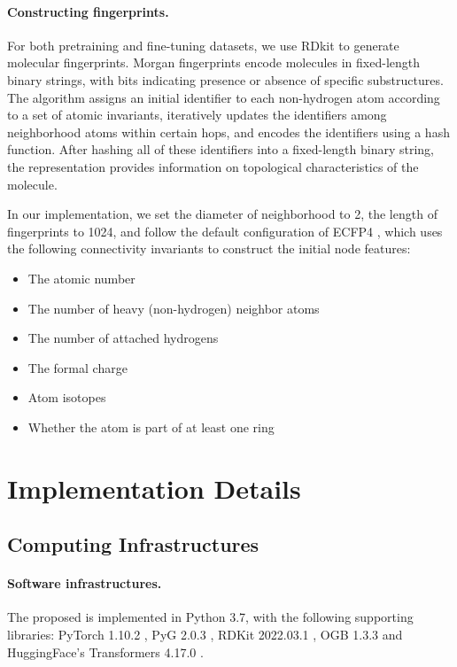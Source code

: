 \paragraph{Constructing fingerprints.}
For both pretraining and fine-tuning datasets, we use RDkit to generate molecular fingerprints.
Morgan fingerprints \cite{Morgan:1965tg,Glem:2006cf} encode molecules in fixed-length binary strings, with bits indicating presence or absence of specific substructures.
The algorithm assigns an initial identifier to each non-hydrogen atom according to a set of atomic invariants, iteratively updates the identifiers among neighborhood atoms within certain hops, and encodes the identifiers using a hash function.
After hashing all of these identifiers into a fixed-length binary string, the representation provides information on topological characteristics of the molecule.

In our implementation, we set the diameter of neighborhood to 2, the length of fingerprints to 1024, and follow the default configuration of ECFP4 \cite{Rogers:2010fp}, which uses the following connectivity invariants to construct the initial node features:
\begin{itemize}[nosep]
	\item The atomic number
	\item The number of heavy (non-hydrogen) neighbor atoms
	\item The number of attached hydrogens
	\item The formal charge
	\item Atom isotopes
	\item Whether the atom is part of at least one ring
\end{itemize}

\section{Implementation Details}
\label{supp:implementation}

\subsection{Computing Infrastructures}
\paragraph{Software infrastructures.} 
The proposed \themodel is implemented in Python 3.7, with the following supporting libraries: PyTorch 1.10.2 \cite{Paszke:2019vf}, PyG 2.0.3 \cite{Fey:2019wv}, RDKit 2022.03.1 \cite{Landrum:2022rd}, OGB 1.3.3 \cite{Hu:2020wv} and HuggingFace's Transformers 4.17.0 \cite{Wolf:2020iu}.

